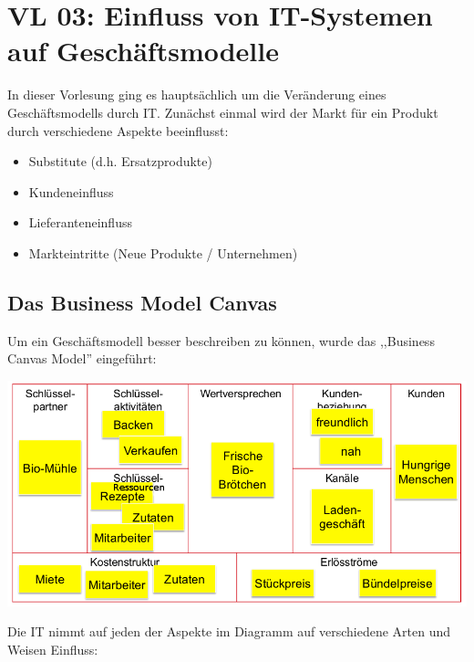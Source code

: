 \newpage
\section{VL 03: Einfluss von IT-Systemen auf Geschäftsmodelle}

In dieser Vorlesung ging es hauptsächlich um die Veränderung eines Geschäftsmodells durch IT. Zunächst einmal wird der Markt für ein Produkt durch verschiedene Aspekte beeinflusst:

\begin{itemize}

    \item Substitute (d.h. Ersatzprodukte)

    \item Kundeneinfluss

    \item Lieferanteneinfluss

    \item Markteintritte (Neue Produkte / Unternehmen)

\end{itemize}

\subsection{Das Business Model Canvas}
    Um ein Geschäftsmodell besser beschreiben zu können, wurde das ,,Business Canvas Model'' eingeführt:

    \begin{center}\includegraphics[width=1\textwidth]{BCM.png}\end{center}

    Die IT nimmt auf jeden der Aspekte im Diagramm auf verschiedene Arten und Weisen Einfluss:

